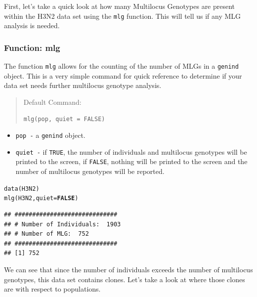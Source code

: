 \documentclass[letterpaper]{article}\usepackage[]{graphicx}\usepackage[]{color}
\makeatletter
\newcommand{\hlnum}[1]{\textcolor[rgb]{0.502,0,0.502}{\textbf{#1}}}%
\newcommand{\hlstd}[1]{\textcolor[rgb]{0,0,0}{#1}}%
\newcommand{\hlkwc}[1]{\textcolor[rgb]{0,0.502,0.753}{#1}}%
\newcommand{\hlkwd}[1]{\textcolor[rgb]{0,0.267,0.4}{#1}}%
\newenvironment{kframe}{%
 \def\at@end@of@kframe{}%
 \ifinner\ifhmode%
  \def\at@end@of@kframe{\end{minipage}}%
  \begin{minipage}{\columnwidth}%
 \fi\fi%
 \def\FrameCommand##1{\hskip\@totalleftmargin \hskip-\fboxsep
 \colorbox{shadecolor}{##1}\hskip-\fboxsep
     \hskip-\linewidth \hskip-\@totalleftmargin \hskip\columnwidth}%
 \MakeFramed {\advance\hsize-\width
   \@totalleftmargin\z@ \linewidth\hsize
   \@setminipage}}%
 {\par\unskip\endMakeFramed%
 \at@end@of@kframe}
\newenvironment{knitrout}{}{} %
\newcommand{\tab}{\hspace*{1em}}
\makeatother
\begin{document}
\tab\tab First, let's take a quick look at how many Multilocus Genotypes are present within the H3N2 data set using the \texttt{mlg} function. This will tell us if any MLG analysis is needed.
\subsubsection{Function: mlg}\label{mlg:mlg:mlg}

\tab\tab The function \texttt{mlg} allows for the counting of the number of MLGs in a \texttt{genind} object. This is a very simple command for quick reference to determine if your data set needs further multilocus genotype analysis.
\begin{quote}
Default Command:
\begin{knitrout}
\color{fgcolor}\begin{kframe}
\begin{verbatim}
mlg(pop, quiet = FALSE)
\end{verbatim}
\end{kframe}
\end{knitrout}

\end{quote}
  \begin{itemize}
    \item \texttt{pop -} a \texttt{genind} object.
    \item \texttt{quiet -} if \texttt{TRUE}, the number of individuals and multilocus genotypes will be printed to the screen, if \texttt{FALSE}, nothing will be printed to the screen and the number of multilocus genotypes will be reported.
  \end{itemize}
\begin{knitrout}\footnotesize
{}\color{fgcolor}\begin{kframe}
\begin{alltt}
\hlkwd{data}\hlstd{(H3N2)}
\hlkwd{mlg}\hlstd{(H3N2,} \hlkwc{quiet} \hlstd{=} \hlnum{FALSE}\hlstd{)}
\end{alltt}
\begin{verbatim}
## #############################
## # Number of Individuals:  1903 
## # Number of MLG:  752 
## #############################
## [1] 752
\end{verbatim}
\end{kframe}
\end{knitrout}

We can see that since the number of individuals exceeds the number of multilocus genotypes, this data set contains clones. Let's take a look at where those clones are with respect to populations.
\end{document}
